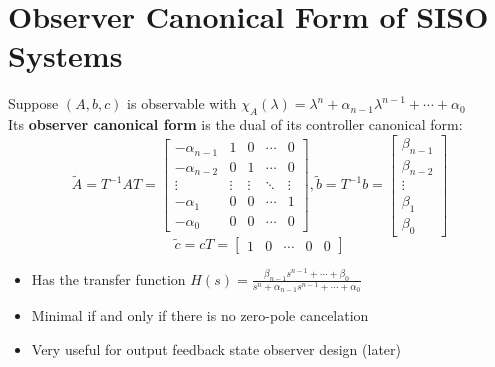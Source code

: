 \documentclass[10pt,a4paper,oneside]{article}
\begin{document}
\section{Observer Canonical Form of SISO Systems}
Suppose $(A, b, c)$ is observable with $\chi_{A}(\lambda)=\lambda^{n}+\alpha_{n-1} \lambda^{n-1}+\cdots+\alpha_{0}$\\
Its {\bfseries observer canonical form} is the dual of its controller canonical form:
\[
\tilde{A}=T^{-1} A T=\left[\begin{array}{ccccc}{-\alpha_{n-1}} & {1} & {0} & {\cdots} & {0} \\ {-\alpha_{n-2}} & {0} & {1} & {\cdots} & {0} \\ {\vdots} & {\vdots} & {\vdots} & {\ddots} & {\vdots} \\ {-\alpha_{1}} & {0} & {0} & {\cdots} & {1} \\ {-\alpha_{0}} & {0} & {0} & {\cdots} & {0}\end{array}\right], \tilde{b}=T^{-1} b=\left[\begin{array}{c}{\beta_{n-1}} \\ {\beta_{n-2}} \\ {\vdots} \\ {\beta_{1}} \\ {\beta_{0}}\end{array}\right]
\]
\[
\tilde{c}=c T=\left[\begin{array}{lllll}{1} & {0} & {\cdots} & {0} & {0}\end{array}\right]
\]
\begin{itemize}
\item Has the transfer function $H(s)=\frac{\beta_{n-1} s^{n-1}+\cdots+\beta_{0}}{s^{n}+\alpha_{n-1} s^{n-1}+\cdots+\alpha_{0}}$
\item Minimal if and only if there is no zero-pole cancelation
\item Very useful for output feedback state observer design (later)
\end{itemize}
\end{document}
